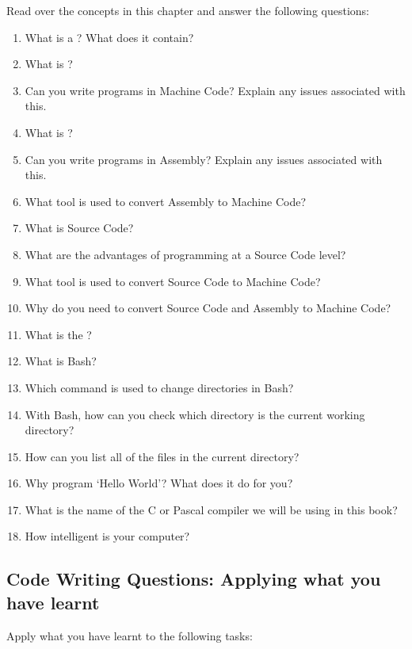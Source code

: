Read over the concepts in this chapter and answer the following questions:
\begin{enumerate}
  \item What is a ? What does it contain?
  \item What is ?
  \item Can you write programs in Machine Code? Explain any issues associated with this.
  \item What is ?
  \item Can you write programs in Assembly? Explain any issues associated with this.
  \item What tool is used to convert Assembly to Machine Code?
  \item What is Source Code?
  \item What are the advantages of programming at a Source Code level?
  \item What tool is used to convert Source Code to Machine Code?
  \item Why do you need to convert Source Code and Assembly to Machine Code?
  \item What is the ? 
  \item What is Bash?
  \item Which command is used to change directories in Bash?
  \item With Bash, how can you check which directory is the current working directory?
  \item How can you list all of the files in the current directory?
  \item Why program `Hello World'? What does it do for you?
  \item What is the name of the C or Pascal compiler we will be using in this book?
  \item How intelligent is your computer?
\end{enumerate}

\medskip
\subsection{Code Writing Questions: Applying what you have learnt} %
\label{sub:code_writing_questions_applying_what_you_have_learnt_compiler}

Apply what you have learnt to the following tasks:

